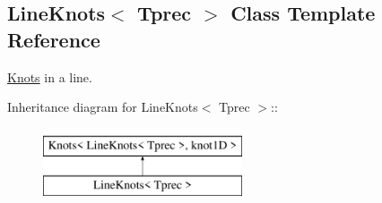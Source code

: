 \hypertarget{classLineKnots}{
\subsection{LineKnots$<$ Tprec $>$ Class Template Reference}
\label{classLineKnots}
}
\hyperlink{classKnots}{Knots} in a line.  


Inheritance diagram for LineKnots$<$ Tprec $>$::\begin{figure}[H]
\begin{center}
\leavevmode
\includegraphics[height=2cm]{classLineKnots}
\end{center}
\end{figure}
